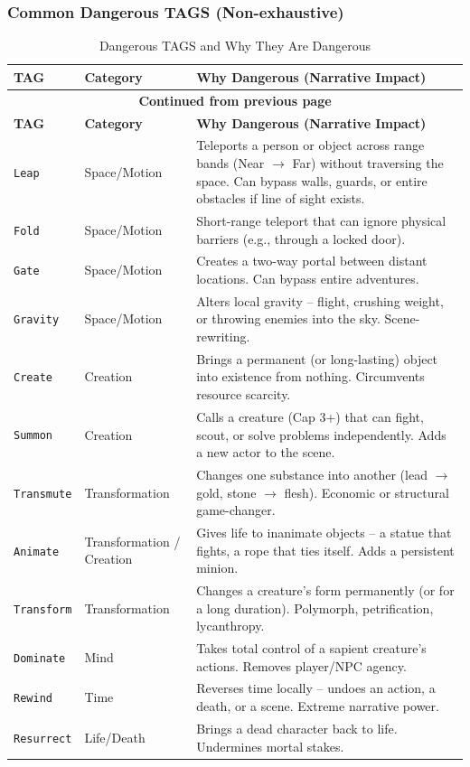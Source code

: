 \subsubsection*{Common Dangerous TAGS (Non-exhaustive)}
\begin{longtable}{p{3cm} p{2.5cm} p{8.5cm}}
\caption{Dangerous TAGS and Why They Are Dangerous}\label{tab:dangerous-tags}\\
\toprule
\textbf{TAG} & \textbf{Category} & \textbf{Why Dangerous (Narrative Impact)} \\
\midrule
\endfirsthead
\multicolumn{3}{c}{{\bfseries Continued from previous page}}  \\
\toprule
\textbf{TAG} & \textbf{Category} & \textbf{Why Dangerous (Narrative Impact)} \\
\midrule
\endhead
\bottomrule
\endfoot
\texttt{Leap} & Space/Motion & Teleports a person or object across range bands (Near $\rightarrow$ Far) without traversing the space. Can bypass walls, guards, or entire obstacles if line of sight exists. \\
\texttt{Fold} & Space/Motion & Short-range teleport that can ignore physical barriers (e.g., through a locked door). \\
\texttt{Gate} & Space/Motion & Creates a two-way portal between distant locations. Can bypass entire adventures. \\
\texttt{Gravity} & Space/Motion & Alters local gravity -- flight, crushing weight, or throwing enemies into the sky. Scene-rewriting. \\
\texttt{Create} & Creation & Brings a permanent (or long-lasting) object into existence from nothing. Circumvents resource scarcity. \\
\texttt{Summon} & Creation & Calls a creature (Cap 3+) that can fight, scout, or solve problems independently. Adds a new actor to the scene. \\
\texttt{Transmute} & Transformation & Changes one substance into another (lead $\rightarrow$ gold, stone $\rightarrow$ flesh). Economic or structural game-changer. \\
\texttt{Animate} & Transformation / Creation & Gives life to inanimate objects -- a statue that fights, a rope that ties itself. Adds a persistent minion. \\
\texttt{Transform} & Transformation & Changes a creature's form permanently (or for a long duration). Polymorph, petrification, lycanthropy. \\
\texttt{Dominate} & Mind & Takes total control of a sapient creature's actions. Removes player/NPC agency. \\
\texttt{Rewind} & Time & Reverses time locally -- undoes an action, a death, or a scene. Extreme narrative power. \\
\texttt{Resurrect} & Life/Death & Brings a dead character back to life. Undermines mortal stakes. \\
\end{longtable}

